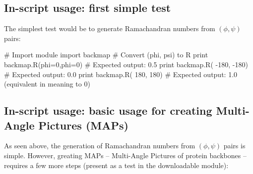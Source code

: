 \documentclass[fleqn,10pt,lineno]{wlpeerj} %
\begin{document}
\subsection*{In-script usage: first simple test}
The simplest test would be to generate Ramachandran numbers from $(\phi,\psi)$ pairs:
\begin{python}
# Import module
import backmap 
# Convert (phi, psi) to R
print backmap.R(phi=0,phi=0) # Expected output: 0.5
print backmap.R( -180, -180) # Expected output: 0.0
print backmap.R(  180,  180) # Expected output: 1.0 (equivalent in meaning to 0)
\end{python}

\subsection*{In-script usage: basic usage for creating Multi-Angle Pictures (MAPs)}
As seen above, the generation of Ramachandran numbers from $(\phi,\psi)$ pairs is simple. However, greating MAPs -- Multi-Angle Pictures of protein backbones -- requires a few more steps (present as a test in the downloadable module):
\end{document}
